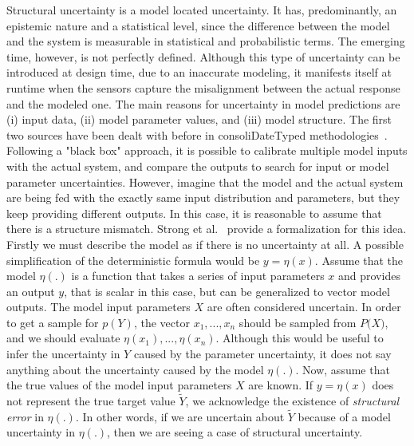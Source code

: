 Structural uncertainty is a model located uncertainty. It has, predominantly, an epistemic nature and a statistical level, since the difference between the model and the system is measurable in statistical and probabilistic terms. The emerging time, however, is not perfectly defined. Although this type of uncertainty can be introduced at design time, due to an inaccurate modeling, it manifests itself at runtime when the sensors capture the misalignment between the actual response and the modeled one. The main reasons for uncertainty in model predictions are (i) input data, (ii) model parameter values, and (iii) model structure. The first two sources have been dealt with before in consoliDateTyped methodologies~\cite{kadane2004methods,strong2012managing,cheung2007identifying,refsgaard2006framework,meedeniya2014evaluating,yin2001uncertainty}. Following a "black box" approach, it is possible to calibrate multiple model inputs with the actual system, and compare the outputs to search for input or model parameter uncertainties. However, imagine that the model and the actual system are being fed with the exactly same input distribution and parameters, but they keep providing different outputs. In this case, it is reasonable to assume that there is a structure mismatch. Strong et al.~\cite{strong2012managing} provide a formalization for this idea. Firstly we must describe the model as if there is no uncertainty at all. A possible simplification of the deterministic formula would be $y=\eta(x)$. Assume that the model $\eta(.)$ is a function that takes a series of input parameters $x$ and provides an output $y$, that is scalar in this case, but can be generalized to vector model outputs. The model input parameters \textbf{$X$} are often considered uncertain. In order to get a sample for $p(Y)$, the vector $x_{1},...,x_{n}$ should be sampled from $P($\textbf{$X$}$)$, and we should evaluate $\eta(x_{1}),...,\eta(x_{n})$. Although this would be useful to infer the uncertainty in $Y$ caused by the parameter uncertainty, it does not say anything about the uncertainty caused by the model $\eta(.)$. Now, assume that the true values of the model input parameters \textbf{$X$} are known. If $y=\eta(x)$ does not represent the true target value $\tilde{Y}$, we acknowledge the existence of \textit{structural error} in $\eta(.)$. In other words, if we are uncertain about $\tilde{Y}$ because of a model uncertainty in $\eta(.)$, then we are seeing a case of structural uncertainty.

